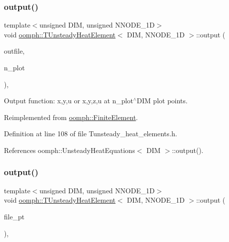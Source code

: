 \subsubsection{\texorpdfstring{output()}{output()}\hspace{0.1cm}{\footnotesize\ttfamily [2/4]}}
{\footnotesize\ttfamily template$<$unsigned D\+IM, unsigned N\+N\+O\+D\+E\+\_\+1D$>$ \\
void \hyperlink{classoomph_1_1TUnsteadyHeatElement}{oomph\+::\+T\+Unsteady\+Heat\+Element}$<$ D\+IM, N\+N\+O\+D\+E\+\_\+1D $>$\+::output (\begin{DoxyParamCaption}\item[{std\+::ostream \&}]{outfile,  }\item[{const unsigned \&}]{n\+\_\+plot }\end{DoxyParamCaption})\hspace{0.3cm}{\ttfamily [inline]}, {\ttfamily [virtual]}}



Output function\+: x,y,u or x,y,z,u at n\+\_\+plot$^\wedge$\+D\+IM plot points. 



Reimplemented from \hyperlink{classoomph_1_1FiniteElement_afa9d9b2670f999b43e6679c9dd28c457}{oomph\+::\+Finite\+Element}.



Definition at line 108 of file Tunsteady\+\_\+heat\+\_\+elements.\+h.



References oomph\+::\+Unsteady\+Heat\+Equations$<$ D\+I\+M $>$\+::output().

\mbox{\label{classoomph_1_1TUnsteadyHeatElement_a278bcf1033d234317dd3a0f8ed306e89}} 
\subsubsection{\texorpdfstring{output()}{output()}\hspace{0.1cm}{\footnotesize\ttfamily [3/4]}}
{\footnotesize\ttfamily template$<$unsigned D\+IM, unsigned N\+N\+O\+D\+E\+\_\+1D$>$ \\
void \hyperlink{classoomph_1_1TUnsteadyHeatElement}{oomph\+::\+T\+Unsteady\+Heat\+Element}$<$ D\+IM, N\+N\+O\+D\+E\+\_\+1D $>$\+::output (\begin{DoxyParamCaption}\item[{F\+I\+LE $\ast$}]{file\+\_\+pt }\end{DoxyParamCaption})\hspace{0.3cm}{\ttfamily [inline]}, {\ttfamily [virtual]}}



